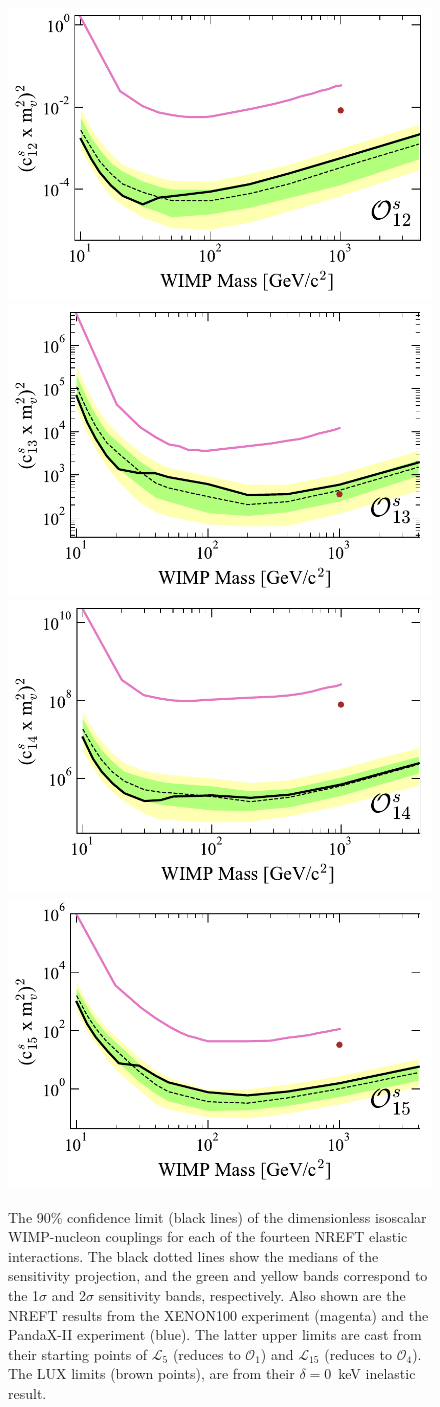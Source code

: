 \documentclass[reprint, showpacs,
preprintnumbers,
amsmath,amssymb,
aps, floatfix,
superscriptaddress,
prd, nofootinbib]{revtex4-1}
\begin{document}
\begin{figure}
    \includegraphics[width=0.5\columnwidth]{SR1_EFT_O12s_c2_lim_Comparison}
    \includegraphics[width=0.5\columnwidth]{SR1_EFT_O13s_c2_lim_Comparison}
    \includegraphics[width=0.5\columnwidth]{SR1_EFT_O14s_c2_lim_Comparison}
    \includegraphics[width=0.5\columnwidth]{SR1_EFT_O15s_c2_lim_Comparison}
    \caption{
    The 90\% confidence limit (black lines) of the dimensionless isoscalar WIMP-nucleon couplings for each of the fourteen NREFT elastic interactions.
    The black dotted lines show the medians of the sensitivity projection, and the green and yellow bands correspond to the 1$\sigma$ and 2$\sigma$ sensitivity bands, respectively.
    Also shown are the NREFT results from the XENON100 experiment (magenta) and the PandaX-II experiment (blue).
    The latter upper limits are cast from their starting points of $\mathcal{L}_5$ (reduces to $\mathcal{O}_1$) and $\mathcal{L}_{15}$ (reduces to $\mathcal{O}_4$).
    The LUX limits (brown points), are from their $\delta=0$~keV inelastic result.
    }
  \label{fig:limits-elastic-s}
\end{figure}
\end{document}
